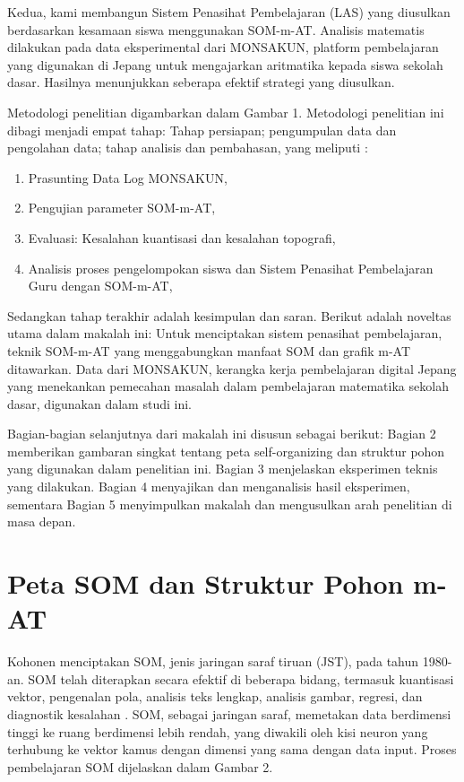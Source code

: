     Kedua, kami membangun Sistem Penasihat Pembelajaran (LAS) yang diusulkan berdasarkan kesamaan siswa menggunakan SOM-m-AT. Analisis matematis dilakukan pada data eksperimental dari MONSAKUN, platform pembelajaran yang digunakan di Jepang untuk mengajarkan aritmatika kepada siswa sekolah dasar. Hasilnya menunjukkan seberapa efektif strategi yang diusulkan.
    
    Metodologi penelitian digambarkan dalam Gambar 1. Metodologi penelitian ini dibagi menjadi empat tahap: Tahap persiapan; pengumpulan data dan pengolahan data; tahap analisis dan pembahasan, yang meliputi :

    \begin{enumerate}
        \item Prasunting Data Log MONSAKUN,
        \item Pengujian parameter SOM-m-AT,
        \item Evaluasi: Kesalahan kuantisasi dan kesalahan topografi,
        \item Analisis proses pengelompokan siswa dan Sistem Penasihat Pembelajaran Guru dengan SOM-m-AT,
    \end{enumerate}

    Sedangkan tahap terakhir adalah kesimpulan dan saran. Berikut adalah noveltas utama dalam makalah ini: Untuk menciptakan sistem penasihat pembelajaran, teknik SOM-m-AT yang menggabungkan manfaat SOM dan grafik m-AT ditawarkan. Data dari MONSAKUN, kerangka kerja pembelajaran digital Jepang yang menekankan pemecahan masalah dalam pembelajaran matematika sekolah dasar, digunakan dalam studi ini.
    
    Bagian-bagian selanjutnya dari makalah ini disusun sebagai berikut: Bagian 2 memberikan gambaran singkat tentang peta self-organizing dan struktur pohon yang digunakan dalam penelitian ini. Bagian 3 menjelaskan eksperimen teknis yang dilakukan. Bagian 4 menyajikan dan menganalisis hasil eksperimen, sementara Bagian 5 menyimpulkan makalah dan mengusulkan arah penelitian di masa depan.

\section{Peta SOM dan Struktur Pohon m-AT}

    Kohonen menciptakan SOM, jenis jaringan saraf tiruan (JST), pada tahun 1980-an. SOM telah diterapkan secara efektif di beberapa bidang, termasuk kuantisasi vektor, pengenalan pola, analisis teks lengkap, analisis gambar, regresi, dan diagnostik kesalahan \citep{Kohonen1998b}. SOM, sebagai jaringan saraf, memetakan data berdimensi tinggi ke ruang berdimensi lebih rendah, yang diwakili oleh kisi neuron yang terhubung ke vektor kamus dengan dimensi yang sama dengan data input. Proses pembelajaran SOM dijelaskan dalam Gambar 2.


